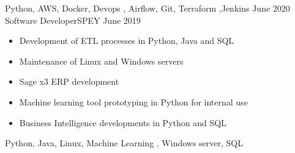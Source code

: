 \begin{experiences}
{\begin{itemize}
    \end{itemize}
  }
  {Python, AWS, Docker, Devops , Airflow, Git, Terraform ,Jenkins}
  \emptySeparator
  \experience
  {June 2020}   {Software Developer}{SP}{EY}
  {June 2019} {
    \begin{itemize}
      \item Development of ETL processes in Python, Java and SQL
      \item Maintenance of Linux and Windows servers
      \item Sage x3 ERP development
      \item Machine learning tool prototyping in Python for internal use
      \item Business Intelligence developments in Python and SQL
    \end{itemize}
  }
  {Python, Java, Linux, Machine Learning , Windows server, SQL}
  \emptySeparator


\end{experiences}
